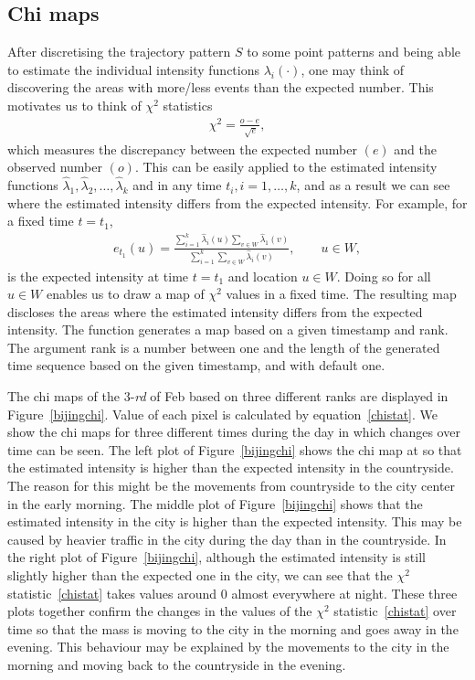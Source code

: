 \documentclass[article]{jss}
\begin{document}
  \subsection{Chi maps}
  After discretising the trajectory pattern $S$ to some point patterns and being able to estimate the individual intensity functions $\lambda_i(\cdot)$, one may think of discovering the areas with more/less events than the expected number. This motivates us to think of $\chi^2$ statistics 
  \begin{eqnarray}\label{chistat}
  \chi^2 =\frac{o-e}{\sqrt[]{e}},
  \end{eqnarray}
  which measures the discrepancy between the expected number $(e)$ and the observed number $(o)$. This can be easily applied to the estimated intensity functions $\widehat{\lambda}_1,\widehat{\lambda}_2,\ldots,\widehat{\lambda}_k$ and in any time $t_i, i=1,\ldots,k$, and as a result we can see where the estimated intensity differs from the expected intensity. For example, for a fixed time $t=t_1$,
  \begin{eqnarray*}
  e_{t_1}(u)=\frac{\sum\limits_{i=1}^k \widehat{\lambda}_i(u) \sum\limits_{v \in W} \widehat{\lambda}_1(v)}{\sum\limits_{i=1}^{k}\sum\limits_{v \in W} \widehat{\lambda}_i (v)}, \qquad u \in W,
  \end{eqnarray*}
  is the expected intensity at time $t=t_1$ and location $u \in W$. Doing so for all $u \in W$ enables us to draw a map of $\chi^2$ values in a fixed time. The resulting map discloses the areas where the estimated intensity differs from the expected intensity. The function  generates a map based on a given timestamp and rank. The argument rank is a number between one and the length of the generated time sequence based on the given timestamp, and with default one.
  
  The chi maps of the $3$-{\it rd} of Feb based on three different ranks are displayed in Figure~\ref{bijingchi}. Value of each pixel is calculated by equation~\ref{chistat}.  We show the chi maps for three different times during the day in which changes over time can be seen. The left plot of Figure~\ref{bijingchi} shows the chi map at  so that the estimated intensity is higher than the expected intensity in the countryside. The reason for this might be the movements from countryside to the city center in the early morning. The middle plot of Figure~\ref{bijingchi} shows that the estimated intensity in the city is higher than the expected intensity. This may be caused  by heavier traffic in the city during the day than in the countryside. In the right plot of Figure~\ref{bijingchi}, although the estimated intensity is still slightly higher than the expected one in the city, we can see that the $\chi^2$ statistic~\ref{chistat} takes values around $0$ almost everywhere at night. These three plots together confirm the changes in the values of the $\chi^2$ statistic~\ref{chistat} over time so that the mass is moving to the city in the morning and goes away in the evening. This behaviour may be explained by the movements to the city in the morning and moving back to the countryside in the evening.
\end{document}
